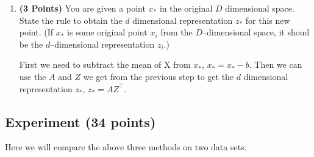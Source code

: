 \documentclass[a4paper]{article}
\theoremstyle{definition}
\newenvironment{soln}{
    \leavevmode\color{blue}\ignorespaces
}{}
\begin{document}
\begin{enumerate}
\begin{soln}
\end{soln}

\item \textbf{(3 Points)}
You are given a point $x_*$ in the original $D$ dimensional space.
State the rule to obtain the $d$ dimensional
representation $z_*$ for this new point.
(If $x_*$ is some original point $x_i$ from the $D$--dimensional space, it shoud be the
$d$--dimensional representation $z_i$.)
\begin{soln}
First we need to subtract the mean of X from $x_*$, $x_* = x_* - b$. Then we can use the $A$ and $Z$ we get from the previous step to get the $d$ dimensional representation $z_*$, $z_* = A Z^\top$.\\
\end{soln}
\end{enumerate}


\subsection{Experiment (34 points)}

Here we will compare the above three methods on two data sets. 
\end{document}
